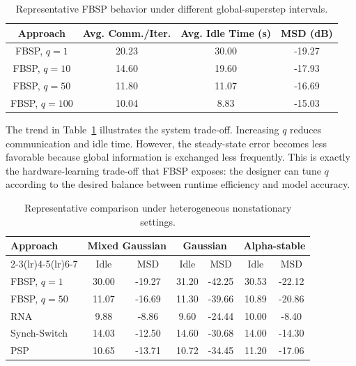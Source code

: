 ﻿\documentclass[10pt,journal]{IEEEtran}
\begin{document}
	\begin{table}[t]
		\centering
		\caption{Representative FBSP behavior under different global-superstep intervals.}
		\label{tab:qiter}
		\begin{tabular}{cccc}
			\toprule
			Approach & Avg. Comm./Iter. & Avg. Idle Time (s) & MSD (dB)\\
			\midrule
			FBSP, $q=1$   & 20.23 & 30.00 & -19.27\\
			FBSP, $q=10$  & 14.60 & 19.60 & -17.93\\
			FBSP, $q=50$  & 11.80 & 11.07 & -16.69\\
			FBSP, $q=100$ & 10.04 & 8.83  & -15.03\\
			\bottomrule
		\end{tabular}
	\end{table}
	
	The trend in Table~\ref{tab:qiter} illustrates the system trade-off. Increasing $q$ reduces communication and idle time. However, the steady-state error becomes less favorable because global information is exchanged less frequently. This is exactly the hardware-learning trade-off that FBSP exposes: the designer can tune $q$ according to the desired balance between runtime efficiency and model accuracy.
	
	\begin{table}[t]
		\centering
		\caption{Representative comparison under heterogeneous nonstationary settings.}
		\label{tab:comparison}
		\begin{tabular}{lcccccc}
			\toprule
			\multirow{2}{*}{Approach}
			& \multicolumn{2}{c}{Mixed Gaussian}
			& \multicolumn{2}{c}{Gaussian}
			& \multicolumn{2}{c}{Alpha-stable}\\
			\cmidrule(lr){2-3}\cmidrule(lr){4-5}\cmidrule(lr){6-7}
			& Idle & MSD & Idle & MSD & Idle & MSD\\
			\midrule
			FBSP, $q=1$  & 30.00 & -19.27 & 31.20 & -42.25 & 30.53 & -22.12\\
			FBSP, $q=50$ & 11.07 & -16.69 & 11.30 & -39.66 & 10.89 & -20.86\\
			RNA          & 9.88  & -8.86  & 9.60  & -24.44 & 10.00 & -8.40\\
			Synch-Switch & 14.03 & -12.50 & 14.60 & -30.68 & 14.00 & -14.30\\
			PSP          & 10.65 & -13.71 & 10.72 & -34.45 & 11.20 & -17.06\\
			\bottomrule
		\end{tabular}
	\end{table}
	
\end{document}
